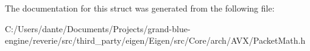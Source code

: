 The documentation for this struct was generated from the following file\+:\begin{DoxyCompactItemize}
\item 
C\+:/\+Users/dante/\+Documents/\+Projects/grand-\/blue-\/engine/reverie/src/third\+\_\+party/eigen/\+Eigen/src/\+Core/arch/\+A\+V\+X/Packet\+Math.\+h\end{DoxyCompactItemize}
